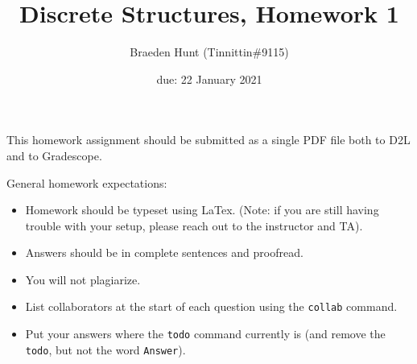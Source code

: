 \documentclass{article}
\title{Discrete Structures, Homework 1}
\author{Braeden Hunt (Tinnittin\#9115)}
\date{due: 22 January 2021}
\begin{document}
\maketitle

This homework assignment should be
submitted as a single PDF file both to D2L and to Gradescope.

General homework expectations:
\begin{itemize}
    \item Homework should be typeset using LaTex.  (Note: if you are still
        having trouble with your setup, please reach out to the instructor and
        TA).
    \item Answers should be in complete sentences and proofread.
    \item You will not plagiarize.
    \item List collaborators at the start of each question using the
        \texttt{collab} command.
    \item Put your answers where the \texttt{todo} command currently is (and
        remove the \texttt{todo}, but not the word \texttt{Answer}).
\end{itemize}

\end{document}

